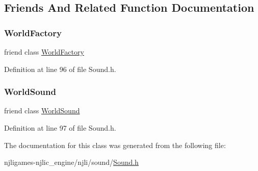 \subsection{Friends And Related Function Documentation}
\mbox{\label{classnjli_1_1_sound_acb96ebb09abe8f2a37a915a842babfac}} 
\subsubsection{\texorpdfstring{World\+Factory}{WorldFactory}}
{\footnotesize\ttfamily friend class \mbox{\hyperlink{classnjli_1_1_world_factory}{World\+Factory}}\hspace{0.3cm}{\ttfamily [friend]}}



Definition at line 96 of file Sound.\+h.

\mbox{\label{classnjli_1_1_sound_ae0be99489b1d41e4e52d3692b0d9cab2}} 
\subsubsection{\texorpdfstring{World\+Sound}{WorldSound}}
{\footnotesize\ttfamily friend class \mbox{\hyperlink{classnjli_1_1_world_sound}{World\+Sound}}\hspace{0.3cm}{\ttfamily [friend]}}



Definition at line 97 of file Sound.\+h.



The documentation for this class was generated from the following file\+:\begin{DoxyCompactItemize}
\item 
njligames-\/njlic\+\_\+engine/njli/sound/\mbox{\hyperlink{_sound_8h}{Sound.\+h}}\end{DoxyCompactItemize}

